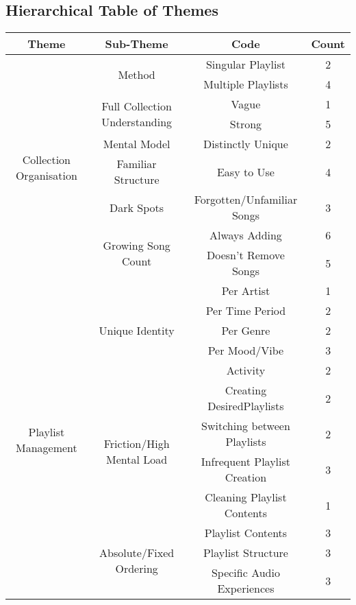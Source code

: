\subsection{Hierarchical Table of Themes}
\begin{longtable}[c]{| c | c | c | c |}
    
    \toprule
    Theme & Sub-Theme & Code & Count\\
    \midrule
    \endhead

    \multirow{9}{6em}{
        Collection Organisation
    } & \multirow{2}{*}{Method} & Singular Playlist & 2\\*
    & & Multiple Playlists & 4 \\*
    & \multirow{2}{*}{Full Collection Understanding} & Vague & 1\\*
    & & Strong & 5 \\*
    & Mental Model & Distinctly Unique & 2 \\*
    & Familiar Structure & Easy to Use & 4 \\*%
    & Dark Spots & Forgotten/Unfamiliar Songs & 3\\*
    & \multirow{2}{*}{Growing Song Count} & Always Adding & 6\\*
    & & Doesn't Remove Songs & 5 \\*
    \midrule

    \multirow{12}{6em}{
        Playlist Management
    } & \multirow{5}{*}{Unique Identity} & Per Artist & 1 \\*
    & & Per Time Period & 2 \\*
    & & Per Genre & 2 \\*
    & & Per Mood/Vibe & 3 \\*
    & & Activity & 2 \\*
    & \multirow{4}{*}{Friction/High Mental Load} & Creating DesiredPlaylists & 2\\*
    & & Switching between Playlists & 2\\*%
    & & Infrequent Playlist Creation & 3\\*
    & & Cleaning Playlist Contents & 1\\*
    & \multirow{3}{*}{Absolute/Fixed Ordering} & Playlist Contents &3\\*
    & & Playlist Structure & 3\\*
    & & Specific Audio Experiences & 3\\*
    \midrule
    

\end{longtable}
